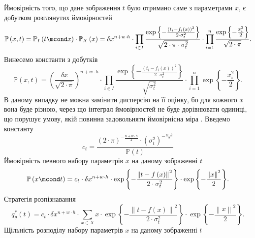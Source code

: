 Ймовірність того,
що дане зображення $t$ було отримано саме з параметрами $x$,
є добутком розглянутих ймовірностей
\begin{equation*}
  \mathbb{P}\left( x, t \right)
  = \mathbb{P}_I\left( t \mcond x \right)
    \cdot \mathbb{P}_X\left( x \right)
  = \delta x^{n + w \cdot h} \cdot \prod_{i \in I}
  \frac{\exp{\left\{ - \frac{\left( t_i - f_i\left( x \right) \right)^2}
       {2 \cdot \sigma_t^2} \right\}}}{\sqrt{2 \cdot \pi \cdot \sigma_t^2}}
  \cdot
  \prod_{i=1}^n
  \frac{\exp{\left\{ - \frac{x_i^2}{2} \right\}}}{\sqrt{2 \cdot \pi}}.
\end{equation*}
Винесемо константи з добутків
\begin{equation*}
  \mathbb{P}\left( x, t \right)
  = \left( \frac{\delta x}{\sqrt{2 \cdot \pi}} \right)^{n + w \cdot h}
    \cdot \prod_{i \in I}
    \frac{\exp{\left\{ - \frac{\left( t_i - f_i\left( x \right) \right)^2}
         {2 \cdot \sigma_t^2} \right\}}}{\sqrt{\sigma_t^2}}
    \cdot
    \prod_{i=1}^n
    \exp{\left\{ - \frac{x_i^2}{2} \right\}}.
\end{equation*}
В даному випадку не можна замінити дисперсію на її оцінку,
бо для кожного $x$ вона буде різною,
через що інтеграл ймовірностей не буде дорівнювати одиниці,
що порушує умову, якій повинна задовольняти ймовірнісна міра
\cite{dorogovtsev:1989}.
Введемо константу
\begin{equation*}
  c_t = \frac{
      \left( 2 \cdot \pi \right)^{- \frac{n + w \cdot h}{2}}
      \cdot \left( \sigma_t^2 \right)^{- \frac{w \cdot h}{2}}
    }{\mathbb{P}\left( t \right)}
\end{equation*}
Ймовірність певного набору параметрів $x$ на даному зображенні $t$
\begin{equation*}
  \mathbb{P}\left( x \mcond t \right)
  = c_t \cdot \delta x^{n + w \cdot h}
    \cdot \exp{\left\{ - \frac{\left\| t - f\left( x \right) \right\|^2}
                              {2 \cdot \sigma_t^2} \right\}}
    \cdot \exp{\left\{ - \frac{\left\| x \right\|^2}{2} \right\}}.
\end{equation*}
Стратегія розпізнавання
\begin{equation*}
  q^*_{\theta}\left( t \right)
  = c_t \cdot \delta x^{n + w \cdot h}
    \cdot \sum_{x \in X}
      x
      \cdot \exp{\left\{ - \frac{\left\| t - f\left( x \right) \right\|^2}
                                {2 \cdot \sigma_t^2} \right\}}
      \cdot \exp{\left\{ - \frac{\left\| x \right\|^2}{2} \right\}}.
\end{equation*}
Щільність розподілу набору параметрів $x$ на даному зображенні $t$
